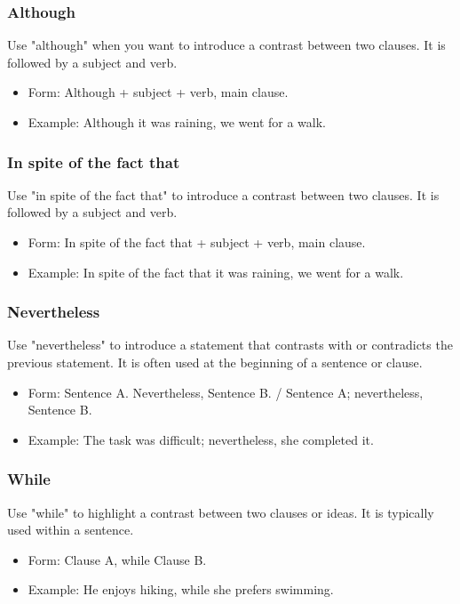 \subsubsection{Although}
Use "although" when you want to introduce a contrast between two clauses. It is followed by a subject and verb.
\begin{itemize}
    \item Form: Although + subject + verb, main clause.
    \item Example: Although it was raining, we went for a walk.
\end{itemize}


\subsubsection{In spite of the fact that}
Use "in spite of the fact that" to introduce a contrast between two clauses. It is followed by a subject and verb.
\begin{itemize}
    \item Form: In spite of the fact that + subject + verb, main clause.
    \item Example: In spite of the fact that it was raining, we went for a walk.
\end{itemize}

\subsubsection{Nevertheless}
Use "nevertheless" to introduce a statement that contrasts with or contradicts the previous statement. It is often used at the beginning of a sentence or clause.
\begin{itemize}
    \item Form: Sentence A. Nevertheless, Sentence B. / Sentence A; nevertheless, Sentence B.
    \item Example: The task was difficult; nevertheless, she completed it.
\end{itemize}

\subsubsection{While}
Use "while" to highlight a contrast between two clauses or ideas. It is typically used within a sentence.
\begin{itemize}
    \item Form: Clause A, while Clause B.
    \item Example: He enjoys hiking, while she prefers swimming.
\end{itemize}


